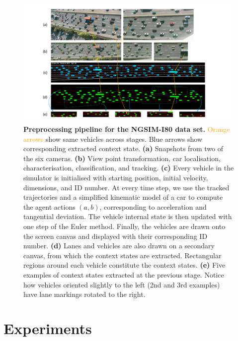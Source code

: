 \documentclass{article}
\begin{document}
\begin{figure}
  \centering
    \includegraphics[width=\textwidth]{images/I-80}
  \caption{
    \textbf{Preprocessing pipeline for the NGSIM-I80 data set.}
    \textcolor{Orange}{Orange arrows} show same vehicles across stages.
    \textcolor{ProcessBlue}{Blue arrows} show corresponding extracted context state.
    \textbf{(a)} Snapshots from two of the six cameras.
    \textbf{(b)} View point transformation, car localisation, characterisation, classification, and tracking.
    \textbf{(c)} Every vehicle in the simulator is initialised with starting position, initial velocity, dimensions, and ID number.
    At every time step, we use the tracked trajectories and a simplified kinematic model of a car to compute the agent actions $(a, b)$, corresponding to acceleration and tangential deviation.
    The vehicle internal state is then updated with one step of the Euler method.
    Finally, the vehicles are drawn onto the screen canvas and displayed with their corresponding ID number.
    \textbf{(d)} Lanes and vehicles are also drawn on a secondary canvas, from which the context states are extracted.
    Rectangular regions around each vehicle constitute the context states.
    \textbf{(e)} Five examples of context states extracted at the previous stage.
    Notice how vehicles oriented slightly to the left (2nd and 3rd examples) have lane markings rotated to the right.
  }
\end{figure}

\section{Experiments}
\end{document}
